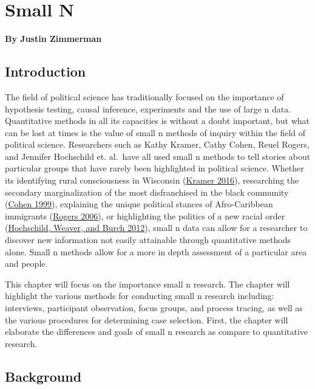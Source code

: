 \documentclass{book}
\begin{document}
\hypertarget{small-n}{%
\chapter{Small N}\label{small-n}}

\textbf{By Justin Zimmerman}

\hypertarget{introduction-7}{%
\section{Introduction}\label{introduction-7}}

The field of political science has traditionally focused on the importance of
hypothesis testing, causal inference, experiments and the use of large n data.
Quantitative methods in all its capacities is without a doubt important, but
what can be lost at times is the value of small n methods of inquiry within
the field of political science. Researchers such as Kathy Kramer, Cathy Cohen,
Reuel Rogers, and Jennifer Hochschild et. al.~have all used small n methods to
tell stories about particular groups that have rarely been highlighted in
political science. Whether its identifying rural consciousness in Wisconsin
(\protect\hyperlink{ref-kramer2016a}{Kramer 2016}), researching the secondary
marginalization of the most disfranchised in the black community
(\protect\hyperlink{ref-cohen1999a}{Cohen 1999}), explaining the unique
political stances of Afro-Caribbean immigrants
(\protect\hyperlink{ref-rogers2006a}{Rogers 2006}), or highlighting the
politics of a new racial order
(\protect\hyperlink{ref-hochschild2012a}{Hochschild, Weaver, and Burch 2012}),
small n data can allow for a researcher to discover new information not easily
attainable through quantitative methods alone. Small n methods allow for a
more in depth assessment of a particular area and people.

This chapter will focus on the importance small n research. The chapter will
highlight the various methods for conducting small n research including:
interviews, participant observation, focus groups, and process tracing, as
well as the various procedures for determining case selection. First, the
chapter will elaborate the differences and goals of small n research as
compare to quantitative research.

\hypertarget{background-2}{%
\section{Background}\label{background-2}}
\end{document}
